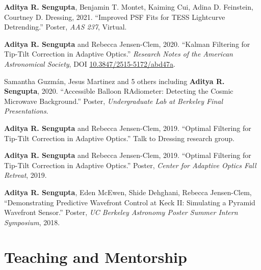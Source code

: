 \documentclass[paper=a4,fontsize=12pt]{scrartcl}
\newcommand{\NewPart}[1]{\section*{{#1}}}
\begin{document}
\begin{etaremune}
    \setlength{\itemsep}{0pt}
    \item \textbf{Aditya R. Sengupta}, Benjamin T. Montet, Kaiming Cui, Adina D. Feinstein, Courtney D. Dressing, 2021. ``Improved PSF Fits for TESS Lightcurve Detrending.'' Poster, \textit{AAS 237}, Virtual.
    \item \textbf{Aditya R. Sengupta} and Rebecca Jensen-Clem, 2020. ``Kalman Filtering for Tip-Tilt Correction in Adaptive Optics.'' \textit{Research Notes of the American Astronomical Society}, DOI {{\color{blue} \href{https://doi.org/10.3847/2515-5172/abd47a}{10.3847/2515-5172/abd47a}}}.
    \item Samantha Guzm\'{a}n, Jesus Martinez and 5 others including \textbf{Aditya R. Sengupta}, 2020. ``Accessible Balloon RAdiometer: Detecting the Cosmic Microwave Background.'' Poster, \textit{Undergraduate Lab at Berkeley Final Presentations}.
    \item \textbf{Aditya R. Sengupta} and Rebecca Jensen-Clem, 2019. ``Optimal Filtering for Tip-Tilt Correction in Adaptive Optics.'' Talk to Dressing research group.
    \item \textbf{Aditya R. Sengupta} and Rebecca Jensen-Clem, 2019. ``Optimal Filtering for Tip-Tilt Correction in Adaptive Optics.'' Poster, \textit{Center for Adaptive Optics Fall Retreat}, 2019.
    \item \textbf{Aditya R. Sengupta}, Eden McEwen, Shide Dehghani, Rebecca Jensen-Clem, ``Demonstrating Predictive Wavefront Control at Keck II: Simulating a Pyramid Wavefront Sensor.'' Poster, \textit{UC Berkeley Astronomy Poster Summer Intern Symposium}, 2018.
\end{etaremune}

\NewPart{Teaching and Mentorship}
\end{document}
